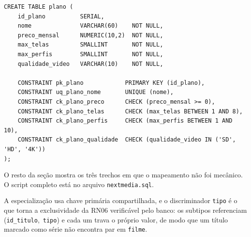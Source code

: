 \documentclass[a4paper,12pt,oneside,openany]{book}
\newcommand{\bd}[1]{\texttt{#1}}
\begin{document}
\begin{lstlisting}[caption={Padrão de definição de tabela com \textit{constraints} nomeadas.},label={lst:exemplo-tabela},basicstyle=\ttfamily\scriptsize]
CREATE TABLE plano (
    id_plano          SERIAL,
    nome              VARCHAR(60)    NOT NULL,
    preco_mensal      NUMERIC(10,2)  NOT NULL,
    max_telas         SMALLINT       NOT NULL,
    max_perfis        SMALLINT       NOT NULL,
    qualidade_video   VARCHAR(10)    NOT NULL,

    CONSTRAINT pk_plano            PRIMARY KEY (id_plano),
    CONSTRAINT uq_plano_nome       UNIQUE (nome),
    CONSTRAINT ck_plano_preco      CHECK (preco_mensal >= 0),
    CONSTRAINT ck_plano_telas      CHECK (max_telas BETWEEN 1 AND 8),
    CONSTRAINT ck_plano_perfis     CHECK (max_perfis BETWEEN 1 AND 10),
    CONSTRAINT ck_plano_qualidade  CHECK (qualidade_video IN ('SD', 'HD', '4K'))
);
\end{lstlisting}

O resto da seção mostra os três trechos em que o mapeamento não foi mecânico.
O script completo está no arquivo \bd{nextmedia.sql}.

A especialização usa chave primária compartilhada, e o discriminador
\bd{tipo} é o que torna a exclusividade da RN06 verificável pelo banco: os
subtipos referenciam \mbox{(\bd{id\_titulo}, \bd{tipo})} e cada um trava o
próprio valor, de modo que um título marcado como série não encontra par em
\bd{filme}.
\end{document}
